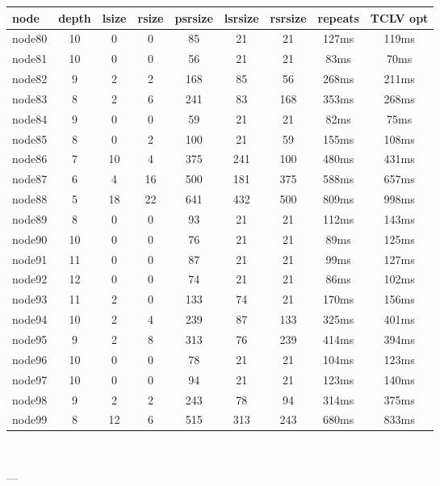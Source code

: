 \begin{tabular}{|l|c|c|c|c|c|c|c|c|}
\hline node & depth & lsize & rsize & psrsize & lsrsize & rsrsize   & repeats & TCLV opt\\
    \hline node80 & 10 & 0 & 0 & 85 & 21 & 21 & 127ms & 119ms\\
    \hline node81 & 10 & 0 & 0 & 56 & 21 & 21 & 83ms & 70ms\\
    \hline node82 & 9 & 2 & 2 & 168 & 85 & 56 & 268ms & 211ms\\
    \hline node83 & 8 & 2 & 6 & 241 & 83 & 168 & 353ms & 268ms\\
    \hline node84 & 9 & 0 & 0 & 59 & 21 & 21 & 82ms & 75ms\\
    \hline node85 & 8 & 0 & 2 & 100 & 21 & 59 & 155ms & 108ms\\
    \hline node86 & 7 & 10 & 4 & 375 & 241 & 100 & 480ms & 431ms\\
    \hline node87 & 6 & 4 & 16 & 500 & 181 & 375 & 588ms & 657ms\\
    \hline node88 & 5 & 18 & 22 & 641 & 432 & 500 & 809ms & 998ms\\
    \hline node89 & 8 & 0 & 0 & 93 & 21 & 21 & 112ms & 143ms\\
    \hline node90 & 10 & 0 & 0 & 76 & 21 & 21 & 89ms & 125ms\\
    \hline node91 & 11 & 0 & 0 & 87 & 21 & 21 & 99ms & 127ms\\
    \hline node92 & 12 & 0 & 0 & 74 & 21 & 21 & 86ms & 102ms\\
    \hline node93 & 11 & 2 & 0 & 133 & 74 & 21 & 170ms & 156ms\\
    \hline node94 & 10 & 2 & 4 & 239 & 87 & 133 & 325ms & 401ms\\
    \hline node95 & 9 & 2 & 8 & 313 & 76 & 239 & 414ms & 394ms\\
    \hline node96 & 10 & 0 & 0 & 78 & 21 & 21 & 104ms & 123ms\\
    \hline node97 & 10 & 0 & 0 & 94 & 21 & 21 & 123ms & 140ms\\
    \hline node98 & 9 & 2 & 2 & 243 & 78 & 94 & 314ms & 375ms\\
    \hline node99 & 8 & 12 & 6 & 515 & 313 & 243 & 680ms & 833ms\\

\hline
\end{tabular} \

---


